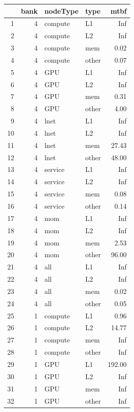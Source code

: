 \begin{table}[ht]
\centering
\begin{tabular}{rrllr}
  \hline
 & bank & nodeType & type & mtbf \\ 
  \hline
1 &   4 & compute & L1 & Inf \\ 
  2 &   4 & compute & L2 & Inf \\ 
  3 &   4 & compute & mem & 0.02 \\ 
  4 &   4 & compute & other & 0.07 \\ 
  5 &   4 & GPU & L1 & Inf \\ 
  6 &   4 & GPU & L2 & Inf \\ 
  7 &   4 & GPU & mem & 0.31 \\ 
  8 &   4 & GPU & other & 4.00 \\ 
  9 &   4 & lnet & L1 & Inf \\ 
  10 &   4 & lnet & L2 & Inf \\ 
  11 &   4 & lnet & mem & 27.43 \\ 
  12 &   4 & lnet & other & 48.00 \\ 
  13 &   4 & service & L1 & Inf \\ 
  14 &   4 & service & L2 & Inf \\ 
  15 &   4 & service & mem & 0.08 \\ 
  16 &   4 & service & other & 0.14 \\ 
  17 &   4 & mom & L1 & Inf \\ 
  18 &   4 & mom & L2 & Inf \\ 
  19 &   4 & mom & mem & 2.53 \\ 
  20 &   4 & mom & other & 96.00 \\ 
  21 &   4 & all & L1 & Inf \\ 
  22 &   4 & all & L2 & Inf \\ 
  23 &   4 & all & mem & 0.02 \\ 
  24 &   4 & all & other & 0.05 \\ 
  25 &   1 & compute & L1 & 0.96 \\ 
  26 &   1 & compute & L2 & 14.77 \\ 
  27 &   1 & compute & mem & Inf \\ 
  28 &   1 & compute & other & Inf \\ 
  29 &   1 & GPU & L1 & 192.00 \\ 
  30 &   1 & GPU & L2 & Inf \\ 
  31 &   1 & GPU & mem & Inf \\ 
  32 &   1 & GPU & other & Inf \\ 

\end{tabular}
\end{table}
